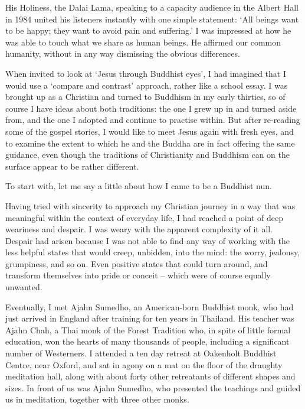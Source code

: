 

\vspace*{0.4\baselineskip}
His Holiness, the Dalai Lama, speaking to a capacity audience in the Albert Hall in 1984 united his listeners instantly with one simple statement: `All beings want to be happy; they want to avoid pain and suffering.' I was impressed at how he was able to touch what we share as human beings. He affirmed our common humanity, without in any way dismissing the obvious differences.

When invited to look at `Jesus through Buddhist eyes', I had imagined that I would use a `compare and contrast' approach, rather like a school essay. I was brought up as a Christian and turned to Buddhism in my early thirties, so of course I have ideas about both traditions: the one I grew up in and turned aside from, and the one I adopted and continue to practise within. But after re-reading some of the gospel stories, I would like to meet Jesus again with fresh eyes, and to examine the extent to which he and the Buddha are in fact offering the same guidance, even though the traditions of Christianity and Buddhism can on the surface appear to be rather different.

To start with, let me say a little about how I came to be a Buddhist nun.

Having tried with sincerity to approach my Christian journey in a way that was meaningful within the context of everyday life, I had reached a point of deep weariness and despair. I was weary with the apparent complexity of it all. Despair had arisen because I was not able to find any way of working with the less helpful states that would creep, unbidden, into the mind: the worry, jealousy, grumpiness, and so on. Even positive states that could turn around, and transform themselves into pride or conceit -- which were of course equally unwanted.

Eventually, I met Ajahn Sumedho, an American-born Buddhist monk, who had just arrived in England after training for ten years in Thailand. His teacher was Ajahn Chah, a Thai monk of the Forest Tradition who, in spite of little formal education, won the hearts of many thousands of people, including a significant number of Westerners. I attended a ten day retreat at Oakenholt Buddhist Centre, near Oxford, and sat in agony on a mat on the floor of the draughty meditation hall, along with about forty other retreatants of different shapes and sizes. In front of us was Ajahn Sumedho, who presented the teachings and guided us in meditation, together with three other monks.


